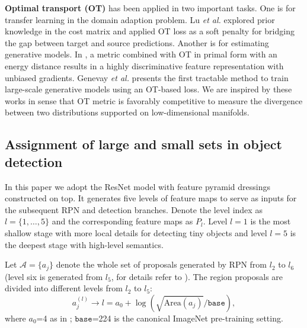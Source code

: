 \documentclass{article} \usepackage{iclr2019_conference,times}
\begin{document}
\textbf{Optimal transport (OT)} has been applied in two important tasks. One is for transfer learning in the domain adaption problem. Lu \textit{et al.} \citep{lu2017ot_transfer_learn} explored prior knowledge in the cost matrix and applied OT loss as a soft penalty for bridging the gap between target and source predictions. Another is for estimating generative models. In \citep{salimans2018improving}, a metric combined with OT in primal form with an energy distance results in a highly discriminative feature representation with unbiased gradients. Genevay \textit{et al.} \citep{genevay2017_sinkhorn_loss} presents the first tractable method to train large-scale generative models using an OT-based loss. We are inspired by these works in sense that OT metric is favorably competitive to measure the divergence between two distributions supported on low-dimensional manifolds.


\subsection{Assignment of large and small sets in object detection}\label{sec:proposal-assignment}
In this paper we adopt the ResNet model \citep{he2016_resnet} with feature pyramid dressings \citep{lin2017_FPN} 
constructed on top. 
It generates five levels
of feature maps to serve as inputs for the subsequent RPN and detection branches. Denote the level index as $l=\{1, \dots, 5\}$ and the corresponding feature maps as $P_l$. Level $l=1$ is the most shallow stage with more local details for detecting tiny objects and level $l=5$ is the deepest stage with high-level semantics. 




Let $\mathcal{A}=\{a_j\}$ denote the whole set of proposals generated by RPN from $l_2$ to $l_6$ (level six is generated from $l_5$, for details refer to \citep{lin2017_FPN}).
The region proposals are divided into different levels from $l_2$ to $l_5$:
\begin{equation}
a_j^{(l)} \rightarrow l = a_0+\log ( \sqrt{\text{Area}(a_j)} / \texttt{base} ), \label{anchor_ass}
\end{equation}
where 
$a_0$=4 as in \citep{lin2017_FPN}; $\texttt{base}$=224 is the canonical ImageNet pre-training setting.
\end{document}
